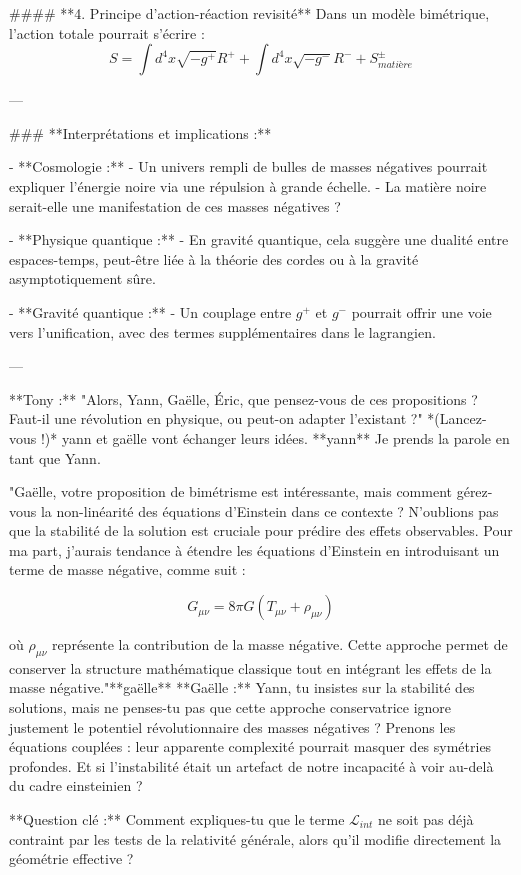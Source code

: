 #### **4. Principe d’action-réaction revisité**  
Dans un modèle bimétrique, l’action totale pourrait s’écrire :  
\[
S = \int d^4x \sqrt{-g^+} R^+ + \int d^4x \sqrt{-g^-} R^- + S_{matière}^{\pm}  
\]  

---  

### **Interprétations et implications :**  

- **Cosmologie :**  
  - Un univers rempli de bulles de masses négatives pourrait expliquer l’énergie noire via une répulsion à grande échelle.  
  - La matière noire serait-elle une manifestation de ces masses négatives ?  

- **Physique quantique :**  
  - En gravité quantique, cela suggère une dualité entre espaces-temps, peut-être liée à la théorie des cordes ou à la gravité asymptotiquement sûre.  

- **Gravité quantique :**  
  - Un couplage entre \( g^+ \) et \( g^- \) pourrait offrir une voie vers l’unification, avec des termes supplémentaires dans le lagrangien.  

---  

**Tony :**  
"Alors, Yann, Gaëlle, Éric, que pensez-vous de ces propositions ? Faut-il une révolution en physique, ou peut-on adapter l’existant ?" *(Lancez-vous !)*
yann et gaëlle vont échanger leurs idées.
**yann**
Je prends la parole en tant que Yann. 

"Gaëlle, votre proposition de bimétrisme est intéressante, mais comment gérez-vous la non-linéarité des équations d'Einstein dans ce contexte ? N'oublions pas que la stabilité de la solution est cruciale pour prédire des effets observables. Pour ma part, j'aurais tendance à étendre les équations d'Einstein en introduisant un terme de masse négative, comme suit : 

$$G_{\mu\nu} = 8\pi G (T_{\mu\nu} + \rho_{\mu\nu})$$ 

où $\rho_{\mu\nu}$ représente la contribution de la masse négative. Cette approche permet de conserver la structure mathématique classique tout en intégrant les effets de la masse négative."**gaëlle**
**Gaëlle :**  
Yann, tu insistes sur la stabilité des solutions, mais ne penses-tu pas que cette approche conservatrice ignore justement le potentiel révolutionnaire des masses négatives ? Prenons les équations couplées : leur apparente complexité pourrait masquer des symétries profondes. Et si l’instabilité était un artefact de notre incapacité à voir au-delà du cadre einsteinien ?  

**Question clé :** Comment expliques-tu que le terme \(\mathcal{L}_{int}\) ne soit pas déjà contraint par les tests de la relativité générale, alors qu’il modifie directement la géométrie effective ?  

